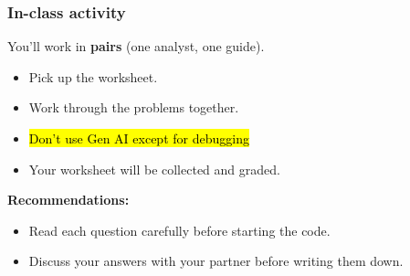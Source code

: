 \documentclass[slidestop,compress,mathserif]{beamer}
\begin{document}
\begin{frame}
\frametitle{In-class activity}

You'll work in \textbf{pairs} (one analyst, one guide).

\medskip
\begin{itemize}
\item Pick up the worksheet.
\item Work through the problems together.
\item \hl{Don't use Gen AI except for debugging}
\item Your worksheet will be collected and graded.
\end{itemize}

\medskip
\textbf{Recommendations:}
\begin{itemize}
\item Read each question carefully before starting the code.
\item Discuss your answers with your partner before writing them down.
\end{itemize}

\end{frame}
\end{document}
